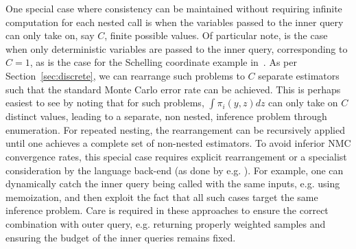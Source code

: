 One special case where consistency can be maintained without requiring infinite computation for each nested call
is when the variables passed to the inner query can only take on, say $C$, finite
possible values. Of particular note, is the case when only deterministic variables are passed to the inner
query, corresponding to $C=1$, as is the case for
the Schelling coordinate example in~\cite[Figure 6]{stuhlmuller2014reasoning}.  
As per Section~\ref{sec:discrete}, we can rearrange such problems to
$C$ separate estimators such that the standard Monte Carlo error rate can be achieved.
This is perhaps easiest to see by noting that for such problems, $\int \pi_i(y,z)dz$ can
only take on $C$ distinct values, leading to a separate, non nested, inference problem through enumeration.
For repeated nesting, the rearrangement can be recursively applied until one achieves
a complete set of non-nested estimators.  To avoid inferior NMC convergence rates, this special case requires 
explicit rearrangement
or a specialist consideration by the language back-end (as done by e.g. \cite{stuhlmuller2012dynamic,stuhlmuller2014reasoning,cornish2017efficient}).  For example, one can
dynamically catch the inner query being called with the same inputs, e.g. using memoization, and then exploit the fact that all
such cases target the same inference problem.  Care is required in these approaches to ensure the correct
combination with outer query, e.g. returning properly weighted samples and ensuring the budget of the
inner queries remains fixed.

